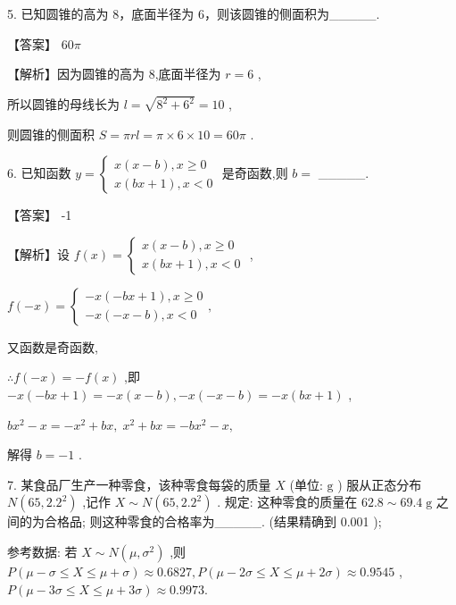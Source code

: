 \documentclass[10pt]{article}
\begin{document}
5. 已知圆锥的高为 8，底面半径为 6，则该圆锥的侧面积为\_\_\_\_\_.

【答案】 \({60\pi }\)

【解析】因为圆锥的高为 8,底面半径为 \(r = 6\) ,

所以圆锥的母线长为 \(l = \sqrt{{8}^{2} + {6}^{2}} = {10}\) ,

则圆锥的侧面积 \(S = {\pi rl} = \pi  \times  6 \times  {10} = {60\pi }\) .

6. 已知函数 \(y = \left\{  \begin{array}{l} x\left( {x - b}\right) ,x \geq  0 \\  x\left( {{bx} + 1}\right) ,x < 0 \end{array}\right.\) 是奇函数,则 \(b =\) \_\_\_\_\_.

【答案】 -1

【解析】设 \(f\left( x\right)  = \left\{  \begin{array}{l} x\left( {x - b}\right) ,x \geq  0 \\  x\left( {{bx} + 1}\right) ,x < 0 \end{array}\right.\) ,

\(f\left( {-x}\right)  = \left\{  {\begin{array}{l}  - x\left( {-{bx} + 1}\right) ,x \geq  0 \\   - x\left( {-x - b}\right) ,x < 0 \end{array},}\right.\)

又函数是奇函数,

\(\therefore f\left( {-x}\right)  =  - f\left( x\right)\) ,即 \(- x\left( {-{bx} + 1}\right)  =  - x\left( {x - b}\right) , - x\left( {-x - b}\right)  =  - x\left( {{bx} + 1}\right)\) ,

\(b{x}^{2} - x =  - {x}^{2} + {bx},\;{x}^{2} + {bx} =  - b{x}^{2} - x,\)

解得 \(b =  - 1\) .

7. 某食品厂生产一种零食，该种零食每袋的质量 \(X\) (单位: \(\mathrm{g}\) ) 服从正态分布 \(N\left( {{65},{2.2}^{2}}\right)\) ,记作 \(X \sim  N\left( {{65},{2.2}^{2}}\right)\) . 规定: 这种零食的质量在 \({62.8} \sim  {69.4}\mathrm{\;g}\) 之间的为合格品; 则这种零食的合格率为\_\_\_\_\_. (结果精确到 0.001 );

参考数据: 若 \(X \sim  N\left( {\mu ,{\sigma }^{2}}\right)\) ,则 \(P\left( {\mu  - \sigma  \leq  X \leq  \mu  + \sigma }\right)  \approx  {0.6827},P\left( {\mu  - {2\sigma } \leq  X \leq  \mu  + {2\sigma }}\right)  \approx  {0.9545}\) , \(P\left( {\mu  - {3\sigma } \leq  X \leq  \mu  + {3\sigma }}\right)  \approx  {0.9973}.\)
\end{document}
